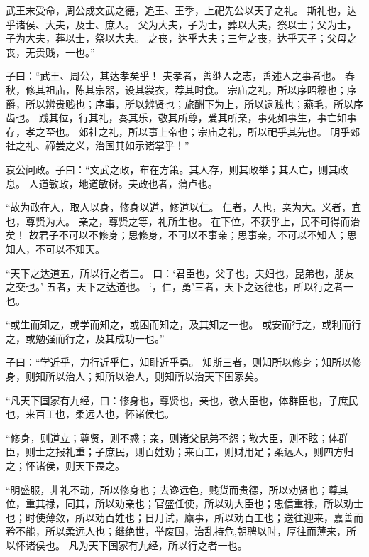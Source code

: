 \documentclass[twoside,openany]{book}
\begin{document}
\begin{pinyinscope}
武王末受命，周公成文武之德，追王、王季，上祀先公以天子之礼。
斯礼也，达乎诸侯、大夫，及士、庶人。
父为大夫，子为士，葬以大夫，祭以士；父为士，子为大夫，葬以士，祭以大夫。
之丧，达乎大夫；三年之丧，达乎天子；父母之丧，无贵贱，一也。”

子曰：“武王、周公，其达孝矣乎！
夫孝者，善继人之志，善述人之事者也。
春秋，修其祖庙，陈其宗器，设其裳衣，荐其时食。
宗庙之礼，所以序昭穆也；序爵，所以辨贵贱也；序事，所以辨贤也；旅酬下为上，所以逮贱也；燕毛，所以序齿也。
践其位，行其礼，奏其乐，敬其所尊，爱其所亲，事死如事生，事亡如事存，孝之至也。
郊社之礼，所以事上帝也；宗庙之礼，所以祀乎其先也。
明乎郊社之礼、禘尝之义，治国其如示诸掌乎！”

哀公问政。子曰：“文武之政，布在方策。其人存，则其政举；其人亡，则其政息。
人道敏政，地道敏树。夫政也者，蒲卢也。

“故为政在人，取人以身，修身以道，修道以仁。
仁者，人也，亲为大。义者，宜也，尊贤为大。
亲之，尊贤之等，礼所生也。
在下位，不获乎上，民不可得而治矣！
故君子不可以不修身；思修身，不可以不事亲；思事亲，不可以不知人；思知人，不可以不知天。

“天下之达道五，所以行之者三。
曰：‘君臣也，父子也，夫妇也，昆弟也，朋友之交也。’
五者，天下之达道也。
‘，仁，勇’三者，天下之达德也，所以行之者一也。

“或生而知之，或学而知之，或困而知之，及其知之一也。
或安而行之，或利而行之，或勉强而行之，及其成功一也。”

子曰：“学近乎，力行近乎仁，知耻近乎勇。
知斯三者，则知所以修身；知所以修身，则知所以治人；知所以治人，则知所以治天下国家矣。

“凡天下国家有九经，曰：修身也，尊贤也，亲也，敬大臣也，体群臣也，子庶民也，来百工也，柔远人也，怀诸侯也。

“修身，则道立；尊贤，则不惑；亲，则诸父昆弟不怨；敬大臣，则不眩；体群臣，则士之报礼重；子庶民，则百姓劝；来百工，则财用足；柔远人，则四方归之；怀诸侯，则天下畏之。

“明盛服，非礼不动，所以修身也；去谗远色，贱货而贵德，所以劝贤也；尊其位，重其禄，同其，所以劝亲也；官盛任使，所以劝大臣也；忠信重禄，所以劝士也；时使薄敛，所以劝百姓也；日月试，廪事，所以劝百工也；送往迎来，嘉善而矜不能，所以柔远人也；继绝世，举废国，治乱持危,朝聘以时，厚往而薄来，所以怀诸侯也。
凡为天下国家有九经，所以行之者一也。


\end{pinyinscope}
\end{document}
